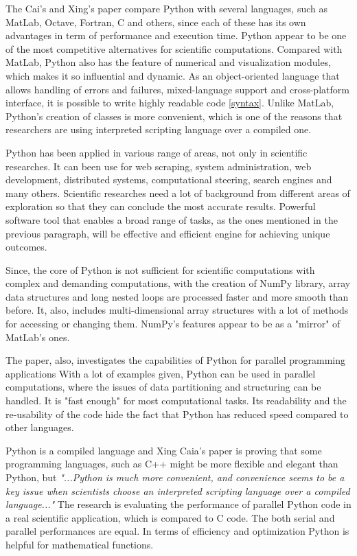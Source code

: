 The Cai's and Xing's paper \cite{cai2005performance} compare Python with several languages, such as MatLab, Octave, Fortran, C and others, since each of these has its own advantages in term of performance and execution time. Python appear to be one of the most competitive alternatives for scientific computations. Compared with MatLab, Python also has the feature of numerical and visualization modules, which makes it so influential and dynamic. As an object-oriented language that allows handling of errors and failures, mixed-language support and cross-platform interface, it is possible to write highly readable code \ref{syntax}. Unlike MatLab, Python's creation of classes is more convenient, which is one of the reasons that researchers are using interpreted scripting language over a compiled one.

Python has been applied in various range of areas, not only in scientific researches. It can been use for web scraping, system administration, web development, distributed systems, computational steering, search engines and many others. \cite{cai2005performance} Scientific researches need a lot of background from different areas of exploration so that they can conclude the most accurate results. Powerful software tool that enables a broad range of tasks, as the ones mentioned in the previous paragraph, will be effective and efficient engine for achieving unique outcomes. 

Since, the core of Python is not sufficient for scientific computations with complex and demanding computations, with the creation of NumPy library, array data structures and long nested loops are processed faster and more smooth than before. It, also, includes multi-dimensional array structures with a lot of methods for accessing or changing them. NumPy's features appear to be as a "mirror" of MatLab's ones. 

The paper, also, investigates the capabilities of Python for parallel programming applications \cite{cai2005performance} With a lot of examples given, Python can be used in parallel computations, where the issues of data partitioning and structuring can be handled. It is "fast enough" for most computational tasks. Its readability and the re-usability of the code hide the fact that Python has reduced speed compared to other languages. 

Python is a compiled language and Xing Caia's paper \cite{cai2005performance} 
is proving that some programming languages, such as C++ might be more flexible and elegant than Python, but \textit{"...Python is much more convenient, and convenience seems to be a key issue when scientists choose an interpreted scripting language over a compiled language..."} \cite{cai2005performance} The research is evaluating the performance of parallel Python code in a real scientific application, which is compared to C code. The both serial and parallel performances are equal. In terms of efficiency and optimization Python is helpful for mathematical functions.

